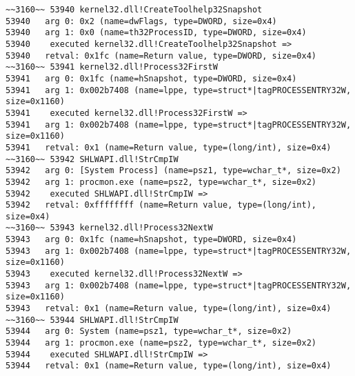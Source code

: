 \vspace{0.5cm}
\begin{lstlisting}[caption={\texttt{procmon.exe} search},captionpos=b]
~~3160~~ 53940 kernel32.dll!CreateToolhelp32Snapshot
53940 	arg 0: 0x2 (name=dwFlags, type=DWORD, size=0x4)
53940 	arg 1: 0x0 (name=th32ProcessID, type=DWORD, size=0x4)
53940    executed kernel32.dll!CreateToolhelp32Snapshot =>
53940 	retval: 0x1fc (name=Return value, type=DWORD, size=0x4)
~~3160~~ 53941 kernel32.dll!Process32FirstW
53941 	arg 0: 0x1fc (name=hSnapshot, type=DWORD, size=0x4)
53941 	arg 1: 0x002b7408 (name=lppe, type=struct*|tagPROCESSENTRY32W, size=0x1160)
53941    executed kernel32.dll!Process32FirstW =>
53941 	arg 1: 0x002b7408 (name=lppe, type=struct*|tagPROCESSENTRY32W, size=0x1160)
53941 	retval: 0x1 (name=Return value, type=(long/int), size=0x4)
~~3160~~ 53942 SHLWAPI.dll!StrCmpIW
53942 	arg 0: [System Process] (name=psz1, type=wchar_t*, size=0x2)
53942 	arg 1: procmon.exe (name=psz2, type=wchar_t*, size=0x2)
53942    executed SHLWAPI.dll!StrCmpIW =>
53942 	retval: 0xffffffff (name=Return value, type=(long/int), size=0x4)
~~3160~~ 53943 kernel32.dll!Process32NextW
53943 	arg 0: 0x1fc (name=hSnapshot, type=DWORD, size=0x4)
53943 	arg 1: 0x002b7408 (name=lppe, type=struct*|tagPROCESSENTRY32W, size=0x1160)
53943    executed kernel32.dll!Process32NextW =>
53943 	arg 1: 0x002b7408 (name=lppe, type=struct*|tagPROCESSENTRY32W, size=0x1160)
53943 	retval: 0x1 (name=Return value, type=(long/int), size=0x4)
~~3160~~ 53944 SHLWAPI.dll!StrCmpIW
53944 	arg 0: System (name=psz1, type=wchar_t*, size=0x2)
53944 	arg 1: procmon.exe (name=psz2, type=wchar_t*, size=0x2)
53944    executed SHLWAPI.dll!StrCmpIW =>
53944 	retval: 0x1 (name=Return value, type=(long/int), size=0x4)
\end{lstlisting}

